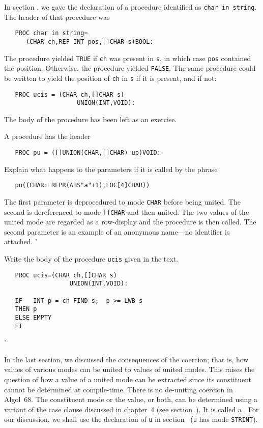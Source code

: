 In section , we gave the declaration of a
procedure identified as \verb|char in string|.  The header of that
procedure was
\begin{verbatim}
   PROC char in string=
      (CHAR ch,REF INT pos,[]CHAR s)BOOL:
\end{verbatim}
\noindent
The procedure yielded \verb|TRUE| if \verb|ch| was present in \verb|s|,
in which case \verb|pos| contained the position. Otherwise, the
procedure yielded \verb|FALSE|. The same procedure could be written to
yield the position of \verb|ch| in \verb|s| if it is present, and
 if not:
\begin{verbatim}
   PROC ucis = (CHAR ch,[]CHAR s)
                    UNION(INT,VOID):
\end{verbatim}
\noindent
The body of the procedure has been left as an exercise.

\begin{exercise}
\item A procedure has the header
\begin{verbatim}
   PROC pu = ([]UNION(CHAR,[]CHAR) up)VOID:
\end{verbatim}
\noindent
Explain what happens to the parameters if it is called by the phrase
\begin{verbatim}
   pu((CHAR: REPR(ABS"a"+1),LOC[4]CHAR))
\end{verbatim}
\indent \ans The first parameter is deprocedured to mode \verb|CHAR|
before being united.  The second is dereferenced to mode
\verb|[]CHAR| and then united.  The two values of the united mode are
regarded as a row-display and the procedure is then called.  The
second parameter is an example of an anonymous name---no identifier
is attached.
'
\item Write the body of the procedure \verb|ucis|
given in the text.  \ans \ %
\begin{verbatim}
   PROC ucis=(CHAR ch,[]CHAR s)
                  UNION(INT,VOID):

   IF   INT p = ch FIND s;  p >= LWB s
   THEN p
   ELSE EMPTY
   FI
\end{verbatim}
'
\end{exercise}

In the last section, we discussed the consequences of the
 coercion; that is, how values of
various modes can be united to values of united modes.  This raises
the question of how a value of a united mode can be extracted since
its constituent  cannot be determined at
compile-time.  There is no de-uniting coercion in Algol~68.  The
constituent mode or the value, or both, can be determined using a
variant of the case clause discussed in chapter~4
(see section~). It is called a
. For our
discussion, we shall use the declaration of \verb|u| in
section~ (\verb|u| has mode \verb|STRINT|).

